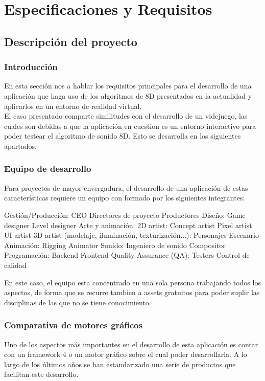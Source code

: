 \section{Especificaciones y Requisitos}

\subsection{Descripción del proyecto}
\subsubsection{Introducción}
\quad En esta sección nos a hablar los requisitos principales para el desarrollo de una aplicación que haga uso de los algoritmos de 8D presentados en la actualidad y aplicarlos en un entorno de realidad virtual.\\ 

\quad El caso presentado comparte similitudes con el desarrollo de un videjuego, las cuales son debidas a que la aplicación en cuestion es un entorno interactivo para poder testear el algoritmo de sonido 8D. Esto se desarrolla en los siguientes apartados.

\subsubsection{Equipo de desarrollo}
\quad Para proyectos de mayor envergadura, el desarrollo de una aplicación de estas características requiere un equipo con formado por los siguientes integrantes:\\
\begin{outline}
\1 Gestión/Producción:
	\2 CEO
	\2 Directores de proyecto
	\2 Productores	
\1 Diseño:
	\2 Game designer
	\2 Level designer
\1 Arte y animación:
	\2 2D artist:
		\3 Concept artist
		\3 Pixel artist
		\3 UI artist
	\2 3D artist (modelaje, iluminación, texturización...):
		\3 Personajes
		\3 Escenario
\1 Animación:
	\2 Rigging
	\2 Animator
\1 Sonido:
	\2 Ingeniero de sonido
	\2 Compositor
\1 Programación:
	\2 Backend
	\2 Frontend
\1 Quality Assurance (QA):
	\2 Testers
	\2 Control de calidad 
\end{outline}

\quad En este caso, el equipo esta concentrado en una sola persona trabajando todos los aspectos, de forma que se recurre tambien a assets gratuitos para poder suplir las disciplinas de las que no se tiene conocimiento.\\ 

\subsubsection{Comparativa de motores gráficos}
\quad Uno de los aspectos más importantes en el desarrollo de esta aplicación es contar con un framework 4 o un motor gráfico sobre el cual poder desarrollarla. A lo largo de
los últimos años se han estandarizado una serie de productos que facilitan este desarrollo.\\

